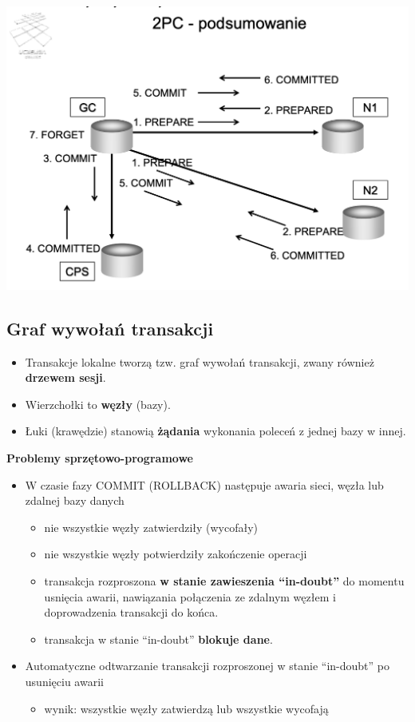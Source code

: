 \documentclass[a4paper]{article}
\begin{document}
    \begin{center}
        \includegraphics[width=\textwidth]{graphics/2pc.png}
    \end{center}

    \subsection{Graf wywołań transakcji}
    \begin{itemize}[noitemsep]
        \item Transakcje lokalne tworzą tzw. graf wywołań transakcji, zwany również \textbf{drzewem sesji}.
        \item Wierzchołki to \textbf{węzły} (bazy).
        \item Łuki (krawędzie) stanowią \textbf{żądania} wykonania poleceń z jednej bazy w innej.
    \end{itemize}

    \textbf{Problemy sprzętowo-programowe}
    \begin{itemize}[noitemsep]
        \item W czasie fazy COMMIT (ROLLBACK) następuje awaria
        sieci, węzła lub zdalnej bazy danych
        \begin{itemize}[noitemsep]
            \item nie wszystkie węzły zatwierdziły (wycofały)
            \item nie wszystkie węzły potwierdziły zakończenie operacji
            \item transakcja rozproszona \textbf{w stanie zawieszenia ``in-doubt''} do momentu usnięcia awarii,
            nawiązania połączenia ze zdalnym węzłem i doprowadzenia transakcji do końca.
            \item transakcja w stanie ``in-doubt'' \textbf{blokuje dane}.
        \end{itemize}
        \item Automatyczne odtwarzanie transakcji rozproszonej w stanie “in-doubt” po usunięciu awarii
        \begin{itemize}[noitemsep]
            \item wynik: wszystkie węzły zatwierdzą lub wszystkie wycofają
        \end{itemize}
    \end{itemize}
\end{document}
